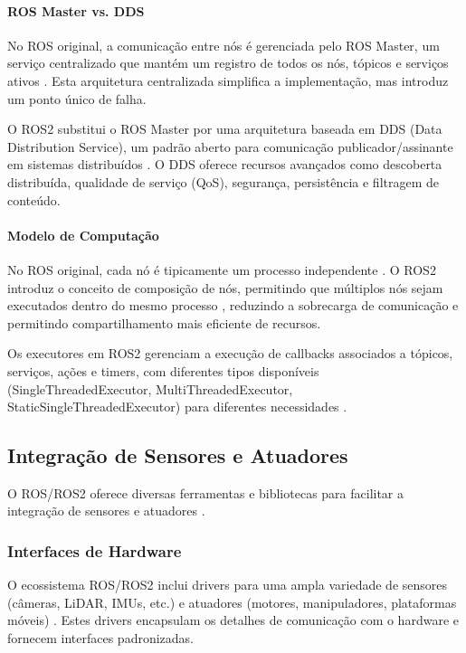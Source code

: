 \paragraph{ROS Master vs. DDS}

No ROS original, a comunicação entre nós é gerenciada pelo ROS Master, um serviço centralizado que mantém um registro de todos os nós, tópicos e serviços ativos \cite{Quigley2009, Joseph2018}. Esta arquitetura centralizada simplifica a implementação, mas introduz um ponto único de falha.

O ROS2 substitui o ROS Master por uma arquitetura baseada em DDS (Data Distribution Service), um padrão aberto para comunicação publicador/assinante em sistemas distribuídos \cite{Macenski2022, ROS2Design2024}. O DDS oferece recursos avançados como descoberta distribuída, qualidade de serviço (QoS), segurança, persistência e filtragem de conteúdo.

\paragraph{Modelo de Computação}

No ROS original, cada nó é tipicamente um processo independente \cite{Quigley2009, Joseph2018}. O ROS2 introduz o conceito de composição de nós, permitindo que múltiplos nós sejam executados dentro do mesmo processo \cite{Macenski2022, ROS2Design2024}, reduzindo a sobrecarga de comunicação e permitindo compartilhamento mais eficiente de recursos.

Os executores em ROS2 gerenciam a execução de callbacks associados a tópicos, serviços, ações e timers, com diferentes tipos disponíveis (SingleThreadedExecutor, MultiThreadedExecutor, StaticSingleThreadedExecutor) para diferentes necessidades \cite{Macenski2022, ROS2Design2024}.

\subsection{Integração de Sensores e Atuadores}

O ROS/ROS2 oferece diversas ferramentas e bibliotecas para facilitar a integração de sensores e atuadores \cite{Joseph2018, Macenski2022}.

\subsubsection{Interfaces de Hardware}

O ecossistema ROS/ROS2 inclui drivers para uma ampla variedade de sensores (câmeras, LiDAR, IMUs, etc.) e atuadores (motores, manipuladores, plataformas móveis) \cite{Joseph2018, Macenski2022}. Estes drivers encapsulam os detalhes de comunicação com o hardware e fornecem interfaces padronizadas.

